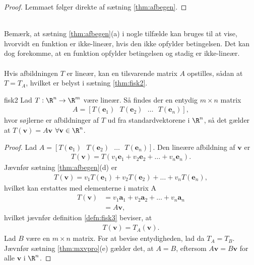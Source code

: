 %
\begin{proof}
Lemmaet følger direkte af sætning \ref{thm:afbegen}.
\end{proof}
\\
%
Bemærk, at sætning \ref{thm:afbegen}(a) i nogle tilfælde kan bruges til at vise, hvorvidt en funktion er ikke-lineær, hvis den ikke opfylder betingelsen. 
Det kan dog forekomme, at en funktion opfylder betingelsen og stadig er ikke-lineær.
% 
\\\\
% 
Hvis afbildningen $T$ er lineær, kan en tilsvarende matrix $A$ opstilles, sådan at $T=T_A$, hvilket er belyst i sætning \ref{thm:fisk2}.
%
% 
\begin{thm}{}{fisk2}
Lad $T: \R^n \rightarrow \R^m$ være lineær. 
Så findes der en entydig $m \times n$ matrix
\begin{align*}
A= [T(\mathbf{e}_1)\text{    } T(\mathbf{e}_2) \text{    } \ldots \text{    } T(\mathbf{e}_n)],
\end{align*}
hvor søjlerne er afbildninger af $T$ ud fra standardvektorene i $\R^n$, så det gælder at $T(\mathbf{v})=A \mathbf{v}$  $\forall \mathbf{v} \in \R^n$.
\end{thm}
%
%
\begin{proof}
Lad $A= [T(\mathbf{e}_1)\text{    } T(\mathbf{e}_2) \text{    } \ldots \text{    } T(\mathbf{e}_n)]$. 
Den lineære afbildning af $\mathbf{v}$ er
%
\begin{align*}
T(\mathbf{v})= T(v_1 \mathbf{e}_1+v_2 \mathbf{e}_2+ \ldots + v_n \mathbf{e}_n).
\end{align*}
%
Jævnfør sætning \ref{thm:afbegen}(d) er
%
\begin{align*}
T(\mathbf{v})= v_1 T( \mathbf{e}_1)+ v_2 T( \mathbf{e}_2) + \ldots + v_n T( \mathbf{e}_n),
\end{align*}
%
hvilket kan erstattes med elementerne i matrix A
%
\begin{align*}
T(\mathbf{v})&= v_1 \mathbf{a}_1+ v_2 \mathbf{a}_2 + \ldots + v_n \mathbf{a}_n \\
&= A \mathbf{v},
\end{align*}
hvilket jævnfør definition \ref{defn:fisk3} beviser, at
%
\begin{align*}
T(\mathbf{v})= T_A (\mathbf{v}).
\end{align*}
%
Lad $B$ være en $m \times n$ matrix. 
For at bevise entydigheden, lad da $T_A=T_B$. 
Jævnfør sætning \ref{thm:mxvpro}(e) gælder det, at $A=B$, eftersom $A \mathbf{v}=B \mathbf{v}$ for alle $\mathbf{v}$ i $\R^n$.
\end{proof}
